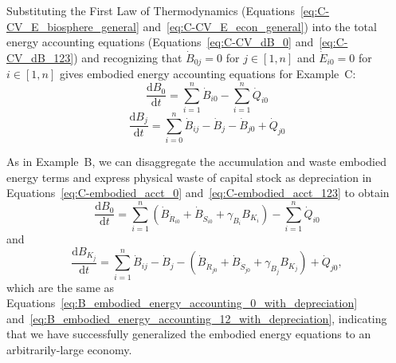 Substituting the First Law of Thermodynamics
(Equations~\ref{eq:C-CV_E_biosphere_general} and~\ref{eq:C-CV_E_econ_general}) 
into the total energy accounting equations 
(Equations~\ref{eq:C-CV_dB_0} and~\ref{eq:C-CV_dB_123}) 
and recognizing that $\dot{B}_{0j} = 0$ for $j \in [1, n]$
and $\dot{E}_{i0} = 0$ for $i \in [1, n]$
gives embodied energy accounting equations for Example~C: %
%
\begin{equation} \label{eq:C-embodied_acct_0}
	\frac{\mathrm{d}B_{0}}{\mathrm{d}t} 	 
	= \sum\limits_{i=1}^{n} \dot{B}_{i0}
	- \sum\limits_{i=1}^{n} \dot{Q}_{i0}
\end{equation}
%
\begin{equation} \label{eq:C-embodied_acct_123}
	\frac{\mathrm{d}B_{j}}{\mathrm{d}t} 	 
	= \sum\limits_{i=0}^{n} \dot{B}_{ij}
	- \dot{B}_{j}
	- \dot{B}_{j0}
	+ \dot{Q}_{j0} 
\end{equation}

As in Example~B, 
we can disaggregate the accumulation and waste embodied energy terms 
and express physical waste of capital stock as depreciation 
in Equations~\ref{eq:C-embodied_acct_0}
and~\ref{eq:C-embodied_acct_123}
to obtain
%
\begin{equation} \label{eq:C_embodied_energy_accounting_0_with_depreciation}
	\frac{\mathrm{d}B_{0}}{\mathrm{d}t} 
	= \sum\limits_{i=1}^n 
		\left( \dot{B}_{\dot{R}_{i0}} 
				+ \dot{B}_{\dot{S}_{i0}} 
				+ \gamma_{B_{i}} B_{K_{i}} \right)
	- \sum\limits_{i=1}^n\dot{Q}_{i0} 
\end{equation}
%
and
%
\begin{equation} \label{eq:C_embodied_energy_accounting_123_with_depreciation}
	\frac{\mathrm{d}B_{K_{j}}}{\mathrm{d}t} 
	= \sum\limits_{i=1}^n\dot{B}_{ij} 
	- \dot{B}_{j}
	- \left( \dot{B}_{\dot{R}_{j0}}
		+ \dot{B}_{\dot{S}_{j0}}
		+ \gamma_{B_{j}} B_{K_{j}} \right)
	+ \dot{Q}_{j0},
\end{equation}
%
which are the same as 
Equations~\ref{eq:B_embodied_energy_accounting_0_with_depreciation}
and~\ref{eq:B_embodied_energy_accounting_12_with_depreciation},
indicating that we have successfully generalized the embodied energy
equations to an arbitrarily-large economy.

